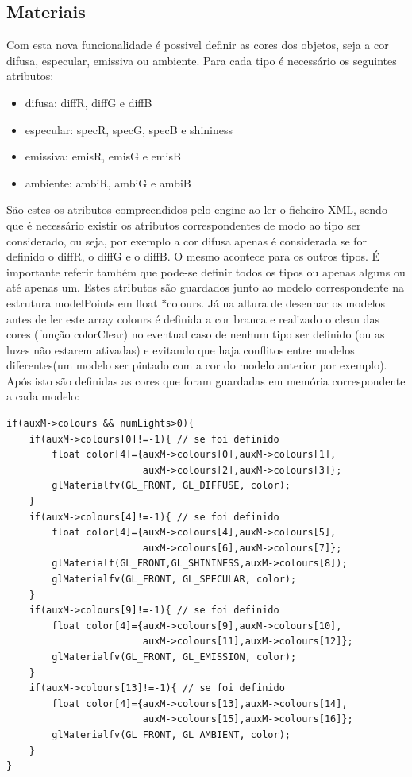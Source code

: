 \documentclass{article}
\begin{document}
\subsection{Materiais}
Com esta nova funcionalidade é possivel definir as cores dos objetos, seja a cor difusa, especular, emissiva ou ambiente. Para cada tipo é necessário os seguintes atributos:
\begin{itemize}
    \item difusa: diffR, diffG e diffB
    \item especular: specR, specG, specB e shininess
    \item emissiva: emisR, emisG e emisB
    \item ambiente: ambiR, ambiG e ambiB
\end{itemize}
São estes os atributos compreendidos pelo engine ao ler o ficheiro XML, sendo que é necessário existir os atributos correspondentes de modo ao tipo ser considerado, ou seja, por exemplo a cor difusa apenas é considerada se for definido o diffR, o diffG e o diffB. O mesmo acontece para os outros tipos. É importante referir também que pode-se definir todos os tipos ou apenas alguns ou até apenas um. Estes atributos são guardados junto ao modelo correspondente na estrutura modelPoints em float *colours.
Já na altura de desenhar os modelos antes de ler este array colours é definida a cor branca e realizado o clean das cores (função colorClear) no eventual caso de nenhum tipo ser definido (ou as luzes não estarem ativadas) e evitando que haja conflitos entre modelos diferentes(um modelo ser pintado com a cor do modelo anterior por exemplo). Após isto são definidas as cores que foram guardadas em memória correspondente a cada modelo:
\begin{verbatim}
if(auxM->colours && numLights>0){
    if(auxM->colours[0]!=-1){ // se foi definido
        float color[4]={auxM->colours[0],auxM->colours[1],
                        auxM->colours[2],auxM->colours[3]};
        glMaterialfv(GL_FRONT, GL_DIFFUSE, color);
    }
    if(auxM->colours[4]!=-1){ // se foi definido
        float color[4]={auxM->colours[4],auxM->colours[5],
                        auxM->colours[6],auxM->colours[7]};
        glMaterialf(GL_FRONT,GL_SHININESS,auxM->colours[8]);
        glMaterialfv(GL_FRONT, GL_SPECULAR, color);
    }
    if(auxM->colours[9]!=-1){ // se foi definido
        float color[4]={auxM->colours[9],auxM->colours[10],
                        auxM->colours[11],auxM->colours[12]};
        glMaterialfv(GL_FRONT, GL_EMISSION, color);
    }
    if(auxM->colours[13]!=-1){ // se foi definido
        float color[4]={auxM->colours[13],auxM->colours[14],
                        auxM->colours[15],auxM->colours[16]};
        glMaterialfv(GL_FRONT, GL_AMBIENT, color);
    }
}
\end{verbatim}
\end{document}
